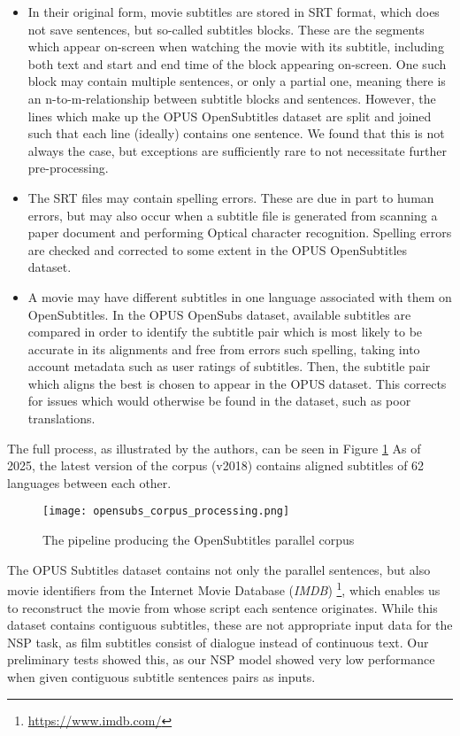 \begin{itemize}
	\item
	      In their original form, movie subtitles are stored in SRT format, which does not save sentences, but so-called subtitles blocks.
	      These are the segments which appear on-screen when watching the movie with its subtitle, including both text and start and end time of the block appearing on-screen.
	      One such block may contain multiple sentences, or only a partial one, meaning there is an n-to-m-relationship between subtitle blocks and sentences.
	      However, the lines which make up the OPUS OpenSubtitles dataset are split and joined such that each line (ideally) contains one sentence.
	      We found that this is not always the case, but exceptions are sufficiently rare to not necessitate further pre-processing.
	\item The SRT files may contain spelling errors.
	      These are due in part to human errors, but may also occur when a subtitle file is generated from scanning a paper document and performing Optical character recognition.
	      Spelling errors are checked and corrected to some extent in the OPUS OpenSubtitles dataset.
	\item
	      A movie may have different subtitles in one language associated with them on OpenSubtitles.
	      In the OPUS OpenSubs dataset, available subtitles are compared in order to identify the subtitle pair which is most likely to be accurate in its alignments and free from errors such spelling, taking into account metadata such as user ratings of subtitles.
	      Then, the subtitle pair which aligns the best is chosen to appear in the OPUS dataset.
	      This corrects for issues which would otherwise be found in the dataset, such as poor translations.
\end{itemize}

The full process, as illustrated by the authors, can be seen in Figure \ref{fig:opensubtitles-pipeline}
As of 2025, the latest version of the corpus (v2018) contains aligned subtitles of 62 languages between each other.

\begin{figure}[H]
	\centering
	\texttt{[image: opensubs\_corpus\_processing.png]}
	\caption{The pipeline producing the OpenSubtitles parallel corpus}
	\label{fig:opensubtitles-pipeline}
\end{figure}

The OPUS Subtitles dataset contains not only the parallel sentences, but also movie identifiers from the Internet Movie Database (\textit{IMDB}) \footnote{\url{https://www.imdb.com/}}, which enables us to reconstruct the movie from whose script each sentence originates.
While this dataset contains contiguous subtitles, these are not appropriate input data for the NSP task, as film subtitles consist of dialogue instead of continuous text.
Our preliminary tests showed this, as our NSP model showed very low performance when given contiguous subtitle sentences pairs as inputs.

